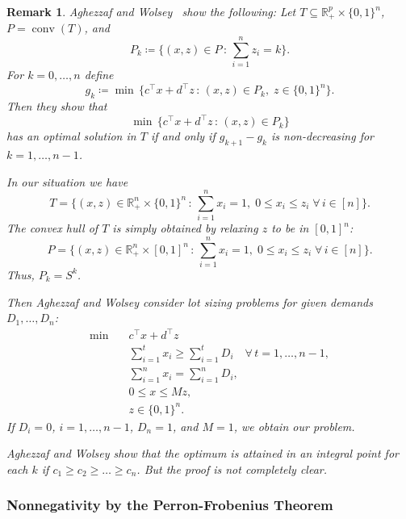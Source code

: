 \documentclass[10pt, a4paper]{article}
\DeclareMathOperator{\conv}{conv}
\newcommand{\suchthat}{\,:\,}
\newcommand{\define}{\coloneqq}
\newcommand{\T}{^{\top}}
\newcommand{\R}{\mathds{R}}
\newcommand{\ones}{\mathds{1}}
\newtheorem{remark}[theorem]{Remark}
\begin{document}
\begin{remark}
  Aghezzaf and Wolsey~\cite{AghW92} show the following: Let
  $T \subseteq \R^p_+ \times \{0,1\}^n$, $P = \conv(T)$, and
  \[
  P_k \define \{ (x,z) \in P \suchthat \sum_{i=1}^n z_i = k\}.
  \]
  For $k = 0, \dots, n$ define
  \[
  g_k \define \min\,\{c\T x + d\T z \suchthat (x,z) \in P_k,\; z \in
  \{0,1\}^n\}.
  \]
  Then they show that
  \[
  \min\,\{c\T x + d\T z \suchthat (x,z) \in P_k\}
  \]
  has an optimal solution in $T$ if and only if $g_{k+1} - g_k$ is
  non-decreasing for $k = 1, \dots, n - 1$.

  In our situation we have
  \[
  T = \{(x,z) \in \R_+^n \times \{0,1\}^n \suchthat \sum_{i=1}^n x_i = 1,\;
  0 \leq x_i \leq z_i \;\forall\, i \in [n]\}.
  \]
  The convex hull of $T$ is simply obtained by relaxing $z$ to be in $[0,1]^n$:
  \[
  P = \{(x,z) \in \R_+^n \times [0,1]^n \suchthat \sum_{i=1}^n x_i = 1,\;
  0 \leq x_i \leq z_i \;\forall\, i \in [n]\}.
  \]
  Thus, $P_k = S^k$.

  Then Aghezzaf and Wolsey consider lot sizing problems for given demands $D_1,
  \dots, D_n$:
  \begin{align*}
    \min\quad & c\T x + d\T z\\
    & \sum_{i=1}^t x_i \geq \sum_{i=1}^t D_i\quad \forall \, t = 1, \dots, n - 1,\\
    & \sum_{i=1}^n x_i = \sum_{i=1}^n D_i,\\
    & 0 \leq x \leq M z,\\
    & z \in \{0,1\}^n.
  \end{align*}
  If $D_i = 0$, $i = 1, \dots, n-1$, $D_n = 1$, and $M = 1$, we obtain our problem.

  Aghezzaf and Wolsey show that the optimum is attained in an integral
  point for each $k$ if $c_1 \geq c_2 \geq \dots \geq c_n$. But the proof
  is not completely clear.
\end{remark}

\subsubsection{Nonnegativity by the Perron-Frobenius Theorem}
\end{document}

